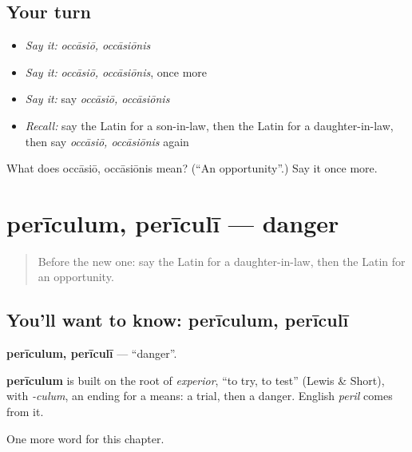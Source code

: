 \subsection*{Your turn}
\begin{itemize}
\raggedright
  \item \emph{Say it:} \emph{occāsiō, occāsiōnis}
  \item \emph{Say it:} \emph{occāsiō, occāsiōnis}, once more
  \item \emph{Say it:} say \emph{occāsiō, occāsiōnis}
  \item \emph{Recall:} say the Latin for a son-in-law, then the Latin for a daughter-in-law, then say \emph{occāsiō, occāsiōnis} again
\end{itemize}

\begin{tcolorbox}[breakable,colback=teal!4,colframe=teal!35!black,title={Before you move on}]
What does occāsiō, occāsiōnis mean? (\textquotedblleft{}An opportunity\textquotedblright{}.) Say it once more.
\end{tcolorbox}
\section[perīculum, perīculī]{perīculum, perīculī — danger}

\label{lesson:LA-C248-periculum}



\begin{quote}
Before the new one: say the Latin for a daughter-in-law, then the Latin for an opportunity.
\end{quote}

\subsection*{You'll want to know: perīculum, perīculī}
\textbf{perīculum, perīculī} — \textquotedblleft{}danger\textquotedblright{}.

\begin{cousinweb}
\textbf{perīculum} is built on the root of \emph{experior}, \textquotedblleft{}to try, to test\textquotedblright{} (Lewis \& Short), with \emph{-culum}, an ending for a means: a trial, then a danger. English \emph{peril} comes from it.
\end{cousinweb}

\begin{grammarlens}[title={What you've built}]
One more word for this chapter.
\end{grammarlens}


